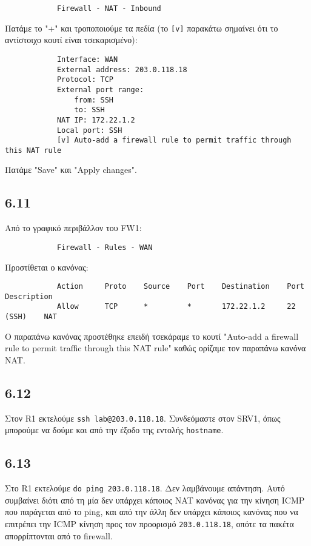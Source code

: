 \documentclass[a4paper, 12pt]{article}
\begin{document}
		\begin{verbatim}
			Firewall - NAT - Inbound
		\end{verbatim}
		
		Πατάμε το "+" και τροποποιούμε τα πεδία (το \verb|[v]| παρακάτω σημαίνει ότι το αντίστοιχο κουτί είναι τσεκαρισμένο):
		
		\begin{verbatim}
			Interface: WAN
			External address: 203.0.118.18
			Protocol: TCP
			External port range: 
			    from: SSH 
			    to: SSH
			NAT IP: 172.22.1.2
			Local port: SSH
			[v] Auto-add a firewall rule to permit traffic through this NAT rule
		\end{verbatim}

		Πατάμε "Save" και "Apply changes".

	\subsection*{6.11}
		Από το γραφικό περιβάλλον του FW1:
		
		\begin{verbatim}
			Firewall - Rules - WAN
		\end{verbatim}
		
		Προστίθεται ο κανόνας:
		
		\begin{verbatim}
			Action     Proto    Source    Port    Destination    Port        Description
			Allow      TCP      *         *       172.22.1.2     22 (SSH)    NAT
		\end{verbatim}

		Ο παραπάνω κανόνας προστέθηκε επειδή τσεκάραμε το κουτί "Auto-add a firewall rule to permit traffic through this NAT rule" καθώς ορίζαμε τον παραπάνω κανόνα NAT.
		
	\subsection*{6.12}
		Στον R1 εκτελούμε \verb|ssh lab@203.0.118.18|. Συνδεόμαστε στον SRV1, όπως μπορούμε να δούμε και από την έξοδο της εντολής \verb|hostname|.

	\subsection*{6.13}
		Στο R1 εκτελούμε \verb|do ping 203.0.118.18|. Δεν λαμβάνουμε απάντηση. Αυτό συμβαίνει διότι από τη μία δεν υπάρχει κάποιος NAT κανόνας για την κίνηση ICMP που παράγεται από το ping, και από την άλλη δεν υπάρχει κάποιος κανόνας που να επιτρέπει την ICMP κίνηση προς τον προορισμό \verb|203.0.118.18|, οπότε τα πακέτα απορρίπτονται από το firewall.
\end{document}

